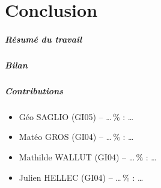 \chapter*{Conclusion}

\paragraph{Résumé du travail}

\paragraph{Bilan}

\paragraph{Contributions}
\begin{itemize}
    \item Géo SAGLIO (GI05) -- \dots\,\% : \dots
    \item Matéo GROS (GI04) -- \dots\,\% : \dots
    \item Mathilde WALLUT (GI04) -- \dots\,\% : \dots
    \item Julien HELLEC (GI04) -- \dots\,\% : \dots
\end{itemize}
